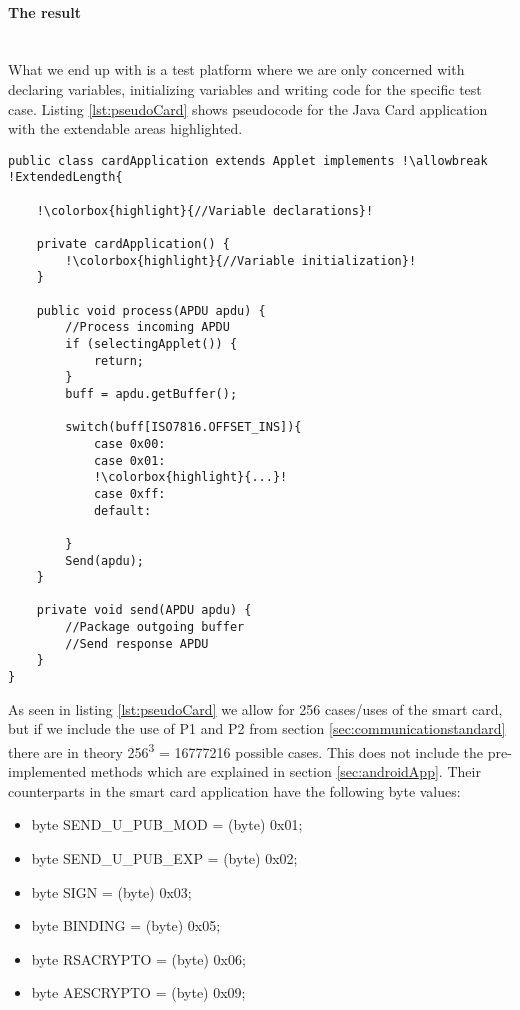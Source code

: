 \paragraph{The result}\mbox{}\\
What we end up with is a test platform where we are only concerned with declaring variables, initializing variables and writing code for the specific test case. Listing \ref{lst:pseudoCard} shows pseudocode for the Java Card application with the extendable areas highlighted.


\begin{lstlisting}[caption=Pseudo code for javacard test application., label=lst:pseudoCard,escapechar=!]
public class cardApplication extends Applet implements !\allowbreak !ExtendedLength{

    !\colorbox{highlight}{//Variable declarations}!

    private cardApplication() {
    	!\colorbox{highlight}{//Variable initialization}!
    }

    public void process(APDU apdu) {
    	//Process incoming APDU
        if (selectingApplet()) {
			return;
		}
        buff = apdu.getBuffer();

    	switch(buff[ISO7816.OFFSET_INS]){
            case 0x00:
            case 0x01:
            !\colorbox{highlight}{...}!
            case 0xff:
            default:

    	}
    	Send(apdu);
    }

    private void send(APDU apdu) {
    	//Package outgoing buffer
    	//Send response APDU
    }
}
\end{lstlisting}

As seen in listing \ref{lst:pseudoCard} we allow for 256 cases/uses of the smart card, but if we include the use of P1 and P2 from section \ref{sec:communicationstandard} there are in theory 256\textsuperscript{3} = 16777216 possible cases. This does not include the pre-implemented methods which are explained in section \ref{sec:androidApp}. Their counterparts in the smart card application have the following byte values:

\begin{itemize}
    \item byte SEND\_U\_PUB\_MOD = (byte) 0x01;
    \item byte SEND\_U\_PUB\_EXP = (byte) 0x02;
    \item byte SIGN = (byte) 0x03;
    \item byte BINDING = (byte) 0x05;
    \item byte RSACRYPTO = (byte) 0x06;
    \item byte AESCRYPTO = (byte) 0x09;
\end{itemize}

